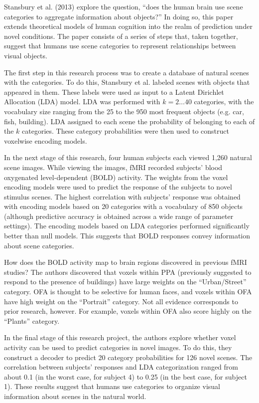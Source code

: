 \documentclass[12pt,letterpaper]{article}
\begin{document}
Stansbury et al. (2013) explore the question, ``does the human brain use scene categories to aggregate information about objects?'' In doing so, this paper extends theoretical models of human cognition into the realm of prediction under novel conditions. The paper consists of a series of steps that, taken together, suggest that humans use scene categories to represent relationships between visual objects. 

The first step in this research process was to create a database of natural scenes with the categories. To do this, Stansbury et al. labeled scenes with objects that appeared in them. These labels were used as input to a Latent Dirichlet Allocation (LDA) model. LDA was performed with $k=2 \ldots 40$ categories, with the vocabulary size ranging from the 25 to the 950 most frequent objects (e.g. car, fish, building). LDA assigned to each scene the probability of belonging to each of the $k$ categories. These category probabilities were then used to construct voxelwise encoding models.

In the next stage of this research, four human subjects each viewed 1,260 natural scene images. While viewing the images, fMRI recorded subjects' blood oxygenated level-dependent (BOLD) activity. The weights from the voxel encoding models were used to predict the response of the subjects to novel stimulus scenes. The highest correlation with subjects' response was obtained with encoding models based on 20 categories with a vocabulary of 850 objects (although predictive accuracy is obtained across a wide range of parameter settings). The encoding models based on LDA categories performed significantly better than null models. This suggests that BOLD responses convey information about scene categories.  

How does the BOLD activity map to brain regions discovered in previous fMRI studies? The authors discovered that voxels within PPA (previously suggested to respond to the presence of buildings) have large weights on the ``Urban/Street'' category. OFA is thought to be selective for human faces, and voxels within OFA have high weight on the ``Portrait'' category. Not all evidence corresponds to prior research, however. For example, voxels within OFA also score highly on the ``Plants'' category.

In the final stage of this research project, the authors explore whether voxel activity can be used to predict categories in novel images. To do this, they construct a decoder to predict 20 category probabilities for 126 novel scenes. The correlation between subjects' responses and LDA categorization ranged from about 0.1 (in the worst case, for subject 4) to 0.25 (in the best case, for subject 1). These results suggest that humans use categories to organize visual information about scenes in the natural world.
\end{document}
